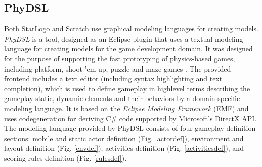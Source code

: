 \documentclass[runningheads,a4paper]{llncs}
\begin{document}
  \newpage
  \subsection{PhyDSL}
  Both StarLogo and Scratch use graphical modeling languages for creating models. 
  \emph{PhyDSL} is a tool, designed as an Eclipse\cite{eclipse} plugin that uses a textual modeling language for creating models for the game development domain.
  It was designed for the purpose of supporting the fast prototyping of physics-based games, including platform, shoot ’em up, 
  puzzle and maze games \cite{guana2014phydsl}. 
  The provided frontend includes a text editor (including syntax highlighting and text completion), which is used to define gameplay in highlevel
  terms describing the gameplay static, dynamic elements and their behaviors by a domain-specific modeling language.  
  It is based on the \emph{Eclipse Modeling Framework}\cite{gronback2009eclipse} (EMF) and uses codegeneration for deriving C\# code supported by Microsoft’s
  DirectX API. 
  The modeling language provided by PhyDSL consists of four gameplay definition sections: mobile and
  static actor definition (Fig. \ref{actordef}), 
  environment and layout definition (Fig. \ref{envdef}), 
  activities definition (Fig. \ref{activitiesdef}), 
  and scoring rules definition (Fig. \ref{rulesdef}).
  
\end{document}
